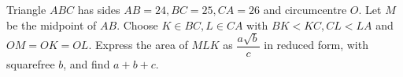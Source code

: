 Triangle $ABC$ has sides $AB=24,BC=25,CA=26$ and circumcentre $O$. Let $M$ be the midpoint of $AB$. Choose $K\in BC,L\in CA$ with $BK<KC,CL<LA$ and $OM=OK=OL$. Express the area of $MLK$ as $\dfrac{a\sqrt b}{c}$ in reduced form, with squarefree $b$, and find $a+b+c$.
